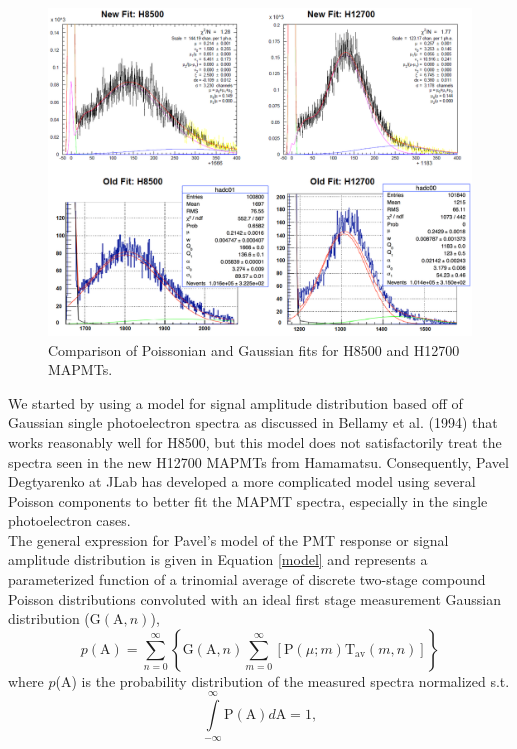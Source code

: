 \documentclass[prc,twocolumn]{revtex4}
\begin{document}
		\begin{figure}
			\includegraphics[width=1.0\linewidth]{comparison2.png}
			\caption{Comparison of Poissonian and Gaussian fits for H8500 	and H12700 MAPMTs.} 
			\label{comparison}
		\end{figure}
		We started by using a model for signal amplitude distribution based off of Gaussian single photoelectron spectra as discussed in Bellamy et al. (1994)\cite{bellamy} that works reasonably well for H8500, but this model does not satisfactorily treat the spectra seen in the new H12700 MAPMTs from Hamamatsu. Consequently, Pavel Degtyarenko at JLab has developed a more complicated model using several Poisson components to better fit the MAPMT spectra, especially in the single photoelectron cases. \cite{pavel}  
		\\ 
		\indent The general expression for Pavel's model of the PMT response or signal amplitude distribution is given in Equation \ref{model} and represents a parameterized function of a trinomial average of discrete two-stage compound Poisson distributions convoluted with an ideal first stage measurement Gaussian distribution ($\mathrm{G}(\mathrm{A},n)$), 
		\begin{equation}
		\label{model}
		p \mathrm{(A)}= \sum\limits_{n=0}^{\infty} \left \{
		\mathrm{G}(\mathrm{A},n)
		\sum\limits_{m=0}^{\infty} \left [ \mathrm{P}(\mu;m)
		\mathrm{T}_{\mathrm{av}}(m,n) \right ] \right \}
		\end{equation}
		where $p$(A) is the probability distribution of the measured spectra normalized s.t. 
		$$\int\limits_{-\infty}^{\infty} \mathrm{P(A)}d\mathrm{A}=1,$$
\end{document}
